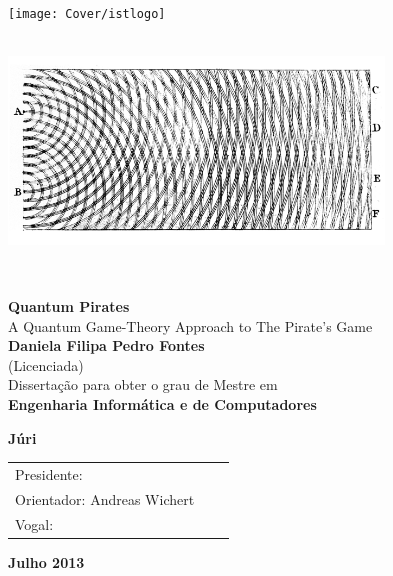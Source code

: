 \setcounter{page}{1} 


\thispagestyle{empty}
\begin{flushleft} ~\\ \vspace{-10mm} \hspace{-9mm}  \texttt{[image: Cover/istlogo]} 
\\ \vspace{5mm}
~\\ \begin{center} \includegraphics[height=50mm]{Figures/Cover/bU-lachas.png}  \end{center} %
~\\ \vspace{5mm}
\begin{centering}
\LARGE \textbf{Quantum Pirates}
\\ \vspace{5mm}
\Large A Quantum Game-Theory Approach to The Pirate's Game
\\ \vspace{15mm}
\Large \textbf{Daniela Filipa Pedro Fontes} \\
(Licenciada)
\\ \vspace{15mm}
\large Disserta\c{c}\~{a}o para obter o grau de Mestre em 
\\ \vspace{2mm}
\LARGE \textbf{Engenharia Inform\'{a}tica e de Computadores}
\\ \vspace{20mm}

\Large \textbf{J\'{u}ri}
\\ \vspace{9mm}
\begin{tabular}{lcl}
\large Presidente: 	&   & \large \\ 
\large Orientador: Andreas Wichert		&   & \large \\ 
\large Vogal:	 				&   & \large \\
\end{tabular}
 
\vspace{9mm}

\Large \textbf{Julho 2013} \\
\end{centering}
\let\thepage\relax
\end{flushleft}
\pagebreak


